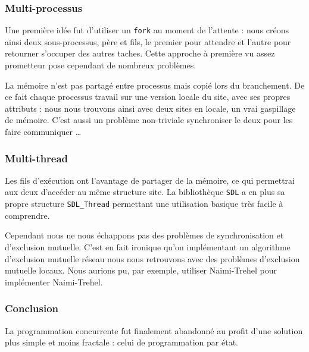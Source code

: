 \subsubsection{Multi-processus}
Une première idée fut d'utiliser un \texttt{fork} au moment de l'attente : nous créons ainsi deux sous-processus, père et fils, le premier pour attendre et l'autre pour retourner s'occuper des autres taches. Cette approche à première vu assez prometteur pose cependant de nombreux problèmes. 

La mémoire n'est pas partagé entre processus mais copié lors du branchement. De ce fait chaque processus travail sur une version locale du site, avec ses propres attributs : nous nous trouvons ainsi avec deux sites en locale, un vrai gaspillage de mémoire. C'est aussi un problème non-triviale synchroniser le deux pour les faire communiquer \dots 

\subsubsection{Multi-thread}
Les fils d'exécution ont l'avantage de partager de la mémoire, ce qui permettrai aux deux d'accéder au même structure site. La bibliothèque \texttt{SDL} a en plus sa propre structure \texttt{SDL\_Thread} permettant une utilisation basique très facile à comprendre. 

Cependant nous ne nous échappons pas des problèmes de synchronisation et d'exclusion mutuelle. C'est en fait ironique qu'on implémentant un algorithme d'exclusion mutuelle réseau nous nous retrouvons avec des problèmes d'exclusion mutuelle locaux. Nous aurions pu, par exemple, utiliser Naimi-Trehel pour implémenter Naimi-Trehel.

\subsubsection{Conclusion}
La programmation concurrente fut finalement abandonné au profit d'une solution plus simple et moins \og fractale \fg{} : celui de programmation par état.